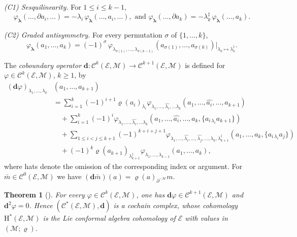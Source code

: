 \documentclass[a4paper,11pt]{article}
\def\Ep{\mathcal{E}}
\def\Mod{\mathcal{M}}
\def\rep{\varrho}
\def\Cch{\mathscr{C}}
\def\la{\lambda}
\newcommand{\dM}{\mathbf{d}}
\numberwithin{equation}{section}
\newtheorem{theorem}{Theorem}[section]
\begin{document}
\smallskip
\noindent\textit{(C1) Sesquilinearity.}
For $1\leq i\leq k-1$,
$$\varphi_{\boldsymbol\lambda}(\ldots,\partial a_i,\ldots)
= -\lambda_i\,\varphi_{\boldsymbol\lambda}(\ldots,a_i,\ldots),
\text{ and }
\varphi_{\boldsymbol\lambda}(\ldots,\partial a_k)
= -\lambda_k^\ddag\,\varphi_{\boldsymbol\lambda}(\ldots,a_k).$$

\smallskip
\noindent\textit{(C2) Graded antisymmetry.}
For every permutation $\sigma$ of $\{1,\ldots,k\}$,
\begin{equation}\label{eq:antisym}
  \varphi_{\boldsymbol\lambda}(a_1,\ldots,a_k)
  = (-1)^\sigma\,
    \varphi_{\lambda_{\sigma(1)},\ldots,\lambda_{\sigma(k-1)}}
    (a_{\sigma(1)},\ldots,a_{\sigma(k)})
    \big|_{\lambda_k\mapsto\lambda_k^\ddag}.
\end{equation}

\medskip
The \textit{coboundary operator}
$\dM:\Cch^k(\Ep,\Mod)\to\Cch^{k+1}(\Ep,\Mod)$
is defined for $\varphi\in\Cch^k(\Ep,\Mod)$, $k\geq 1$, by
\begin{equation}\label{eq:coboundary}
\begin{split}
  (\dM\varphi)_{\la_1,\ldots,\la_k}
  &(a_1,\ldots,a_{k+1}) \\
  &= \sum_{i=1}^{k}(-1)^{i+1}
     \rep(a_i)_{\la_i}
     \varphi_{\la_1,\ldots,\widehat{\la_i},\ldots \la_k}(a_1,\ldots,\widehat{a_i},\ldots,a_{k+1})
     \\
  &\quad
    + \sum_{i=1}^{k}(-1)^i
    \varphi_{\la_1,\ldots,\widehat{\la_i},\ldots \la_k}
      (a_1,\ldots,\widehat{a_i},\ldots,a_k,
       \{a_{i\,\la_i} a_{k+1}\})
      \\
  &\quad
    + \!\!\sum_{1\leq i<j\leq k+1}\!\!(-1)^{k+i+j+1}
      \varphi_{\la_1,\ldots,\widehat{\la_i},\ldots ,\widehat{\la_j},\ldots, \la_k,\la_{k+1}^\ddag}
      (a_1,\ldots,a_k,\{a_{i\,\la_i}a_j\})
      \\
  &\quad
    + (-1)^k\rep(a_{k+1})_{\la_{k+1}^\ddag}
      \varphi_{\la_1,\ldots,\la_{k-1}}(a_1,\ldots,a_k),
\end{split}
\end{equation}
where hats denote the omission of the corresponding index or argument. For $\bar m \in \Cch^0(\Ep,\Mod)$ we have $(\dM \bar m)(a)=\varrho(a)_{\partial^{-\mathcal M}}m$.

\begin{theorem}[{\cite{DK113}}]\label{thm:d-squared}
  For every $\varphi\in\Cch^k(\Ep,\Mod)$, one has $\dM\varphi\in\Cch^{k+1}(\Ep,\Mod)$
  and $\dM^2\varphi = 0$.  Hence $(\Cch^*(\Ep,\Mod),\dM)$ is a cochain complex,
  whose cohomology $\mathrm{H}^*(\Ep,\Mod)$ is the
  \textit{Lie conformal  algebra cohomology} of $\Ep$ with values in $(\Mod;\rep)$.
\end{theorem}
\end{document}
